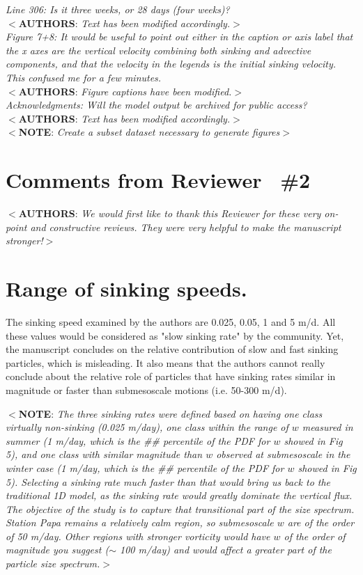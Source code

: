 \documentclass[12pt,letter]{article}
\newcommand{\note}[1]{\color{red}$<$\textbf{NOTE}: \textit{#1}$>$\color{black}}
\newcommand{\rep}[1]{\color{blue}$<$\textbf{AUTHORS}: \textit{#1}$>$\color{black}\\}
\begin{document}
\textit{Line 306: Is it three weeks, or 28 days (four weeks)?}\\
\rep{Text has been modified accordingly.}
\textit{Figure 7+8: It would be useful to point out either in the caption or axis label that the x axes are the vertical velocity combining both sinking and advective components, and that the velocity in the legends is the initial sinking velocity. This confused me for a few minutes.}\\
\rep{Figure captions have been modified.}
\textit{Acknowledgments: Will the model output be archived for public access?}\\
\rep{Text has been modified accordingly.}
\note{Create a subset dataset necessary to generate figures}

\section{Comments from Reviewer  \#2}
\rep{We would first like to thank this Reviewer for these very on-point and constructive reviews. They were very helpful to make the manuscript stronger!}

\section*{Range of sinking speeds.}
The sinking speed examined by the authors are 0.025, 0.05, 1 and 5 m/d. All these values would be considered as "slow sinking rate" by the community. Yet, the manuscript concludes on the relative contribution of slow and fast sinking particles, which is misleading. It also means that the authors cannot really conclude about the relative role of particles that have sinking rates similar in magnitude or faster than submesoscale motions (i.e. 50-300 m/d).

\note{The three sinking rates were defined based on having one class virtually non-sinking (0.025 m/day), one class within the range of $w$ measured in summer (1 m/day, which is the \#\# percentile of the PDF for $w$ showed in Fig 5), and one class with similar magnitude than $w$ observed at submesoscale in the winter case (1 m/day, which is the \#\# percentile of the PDF for $w$ showed in Fig 5). Selecting a sinking rate much faster than that would bring us back to the traditional 1D model, as the sinking rate would greatly dominate the vertical flux. The objective of the study is to capture that transitional part of the size spectrum. Station Papa remains a relatively calm region, so submesoscale $w$ are of the order of 50 m/day. Other regions with stronger vorticity would have $w$ of the order of magnitude you suggest ($\sim$ 100 m/day) and would affect a greater part of the particle size spectrum.}
\end{document}
